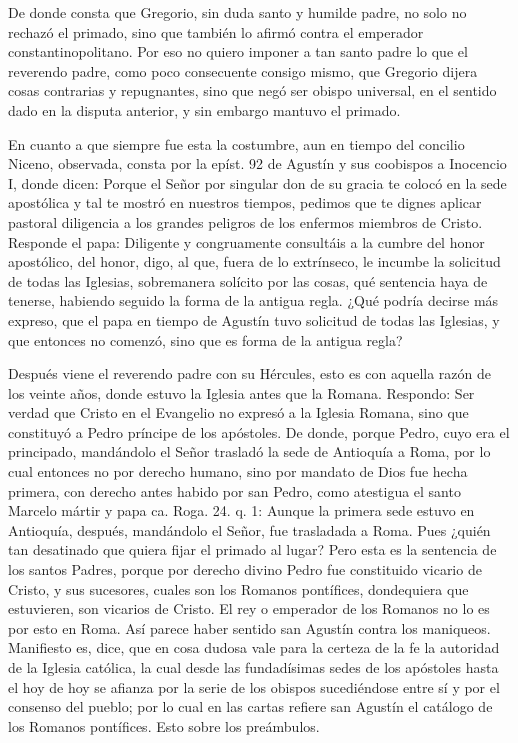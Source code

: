 De donde consta que Gregorio, sin duda santo y humilde padre, no solo no rechazó el primado, sino que también lo afirmó contra el emperador constantinopolitano. Por eso no quiero imponer a tan santo padre lo que el reverendo padre, como poco consecuente consigo mismo, que Gregorio dijera cosas contrarias y repugnantes, sino que negó ser obispo universal, en el sentido dado en la disputa anterior, y sin embargo mantuvo el primado.

En cuanto a que siempre fue esta la costumbre, aun en tiempo del concilio Niceno, observada, consta por la epíst. 92 de Agustín y sus coobispos a Inocencio I, donde dicen: Porque el Señor por singular don de su gracia te colocó en la sede apostólica y tal te mostró en nuestros tiempos, pedimos que te dignes aplicar pastoral diligencia a los grandes peligros de los enfermos miembros de Cristo. Responde el papa: Diligente y congruamente consultáis a la cumbre del honor apostólico, del honor, digo, al que, fuera de lo extrínseco, le incumbe la solicitud de todas las Iglesias, sobremanera solícito por las cosas, qué sentencia haya de tenerse, habiendo seguido la forma de la antigua regla. ¿Qué podría decirse más expreso, \marginpar{\small[292]} que el papa en tiempo de Agustín tuvo solicitud de todas las Iglesias, y que entonces no comenzó, sino que es forma de la antigua regla?

Después viene el reverendo padre con su Hércules, esto es con aquella razón de los veinte años, donde estuvo la Iglesia antes que la Romana. Respondo: Ser verdad que Cristo en el Evangelio no expresó a la Iglesia Romana, sino que constituyó a Pedro príncipe de los apóstoles. De donde, porque Pedro, cuyo era el principado, mandándolo el Señor trasladó la sede de Antioquía a Roma, por lo cual entonces no por derecho humano, sino por mandato de Dios fue hecha primera, con derecho antes habido por san Pedro, como atestigua el santo Marcelo mártir y papa ca. Roga. 24. q. 1: Aunque la primera sede estuvo en Antioquía, después, mandándolo el Señor, fue trasladada a Roma. Pues ¿quién tan desatinado que quiera fijar el primado al lugar? Pero esta es la sentencia de los santos Padres, porque por derecho divino Pedro fue constituido vicario de Cristo, y sus sucesores, cuales son los Romanos pontífices, dondequiera que estuvieren, son vicarios de Cristo. El rey o emperador de los Romanos no lo es por esto en Roma. Así parece haber sentido san Agustín contra los maniqueos. Manifiesto es, dice, que en cosa dudosa vale para la certeza de la fe la autoridad de la Iglesia católica, la cual desde las fundadísimas sedes de los apóstoles hasta el hoy de hoy se afianza por la serie de los obispos sucediéndose entre sí y por el consenso del pueblo; por lo cual en las cartas refiere san Agustín el catálogo de los Romanos pontífices. Esto sobre los preámbulos.

